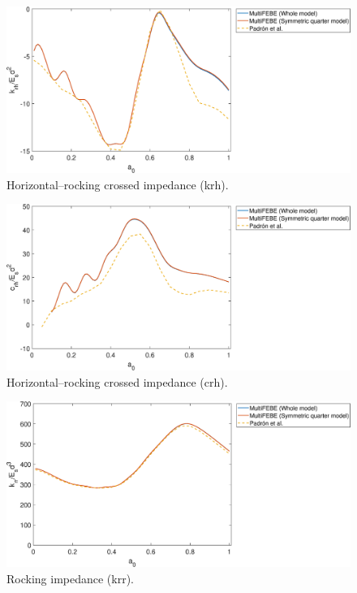 \documentclass[a4]{article}
\begin{document}
\begin{figure}[h!]
	\centering
	\includegraphics[scale=0.5]{krh_2x2_group.eps}
	\caption{Horizontal–rocking crossed impedance (krh).}
	\label{fig:krh_2x2_group}
\end{figure}

\begin{figure}[h!]
	\centering
	\includegraphics[scale=0.5]{crh_2x2_group.eps}
	\caption{Horizontal–rocking crossed impedance (crh).}
	\label{fig:crh_2x2_group}
\end{figure}

\begin{figure}[h!]
	\centering
	\includegraphics[scale=0.5]{krr_2x2_group.eps}
	\caption{Rocking impedance (krr).}
	\label{fig:krr_2x2_group}
\end{figure}
\end{document}
